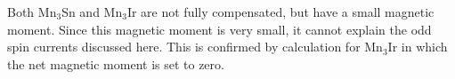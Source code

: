 \documentclass[aps,prl,reprint,amsmath,amssymb,superscriptaddress]{revtex4-1}
\begin{document}
Both Mn$_3$Sn and Mn$_3$Ir are not fully compensated, but have a small magnetic moment. Since this magnetic moment is very small, it cannot explain the odd spin currents discussed here. This is confirmed by calculation for Mn$_3$Ir in which the net magnetic moment is set to zero.
% 
% 
\end{document}
